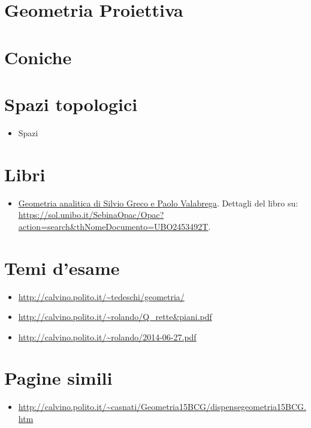 \documentclass[a4paper,10pt]{article}
\begin{document}
\section{Geometria Proiettiva}

\section{Coniche}

\section{Spazi topologici}
  \begin{itemize}
  	\item Spazi
  \end{itemize}
  
  
\section{Libri}
  \begin{itemize}
   \item \href{./libro001.html}{Geometria analitica di Silvio Greco e Paolo Valabrega}. Dettagli del libro su: \url{https://sol.unibo.it/SebinaOpac/Opac?action=search&thNomeDocumento=UBO2453492T}.
  \end{itemize}

\section{Temi d'esame}
  \begin{itemize}
   \item \url{http://calvino.polito.it/~tedeschi/geometria/}
   \item \url{http://calvino.polito.it/~rolando/Q_rette&piani.pdf}
   \item \url{http://calvino.polito.it/~rolando/2014-06-27.pdf}
  \end{itemize}

\section{Pagine simili}
\begin{itemize}
  \item \url{http://calvino.polito.it/~casnati/Geometria15BCG/dispensegeometria15BCG.htm}
\end{itemize}
\end{document}
